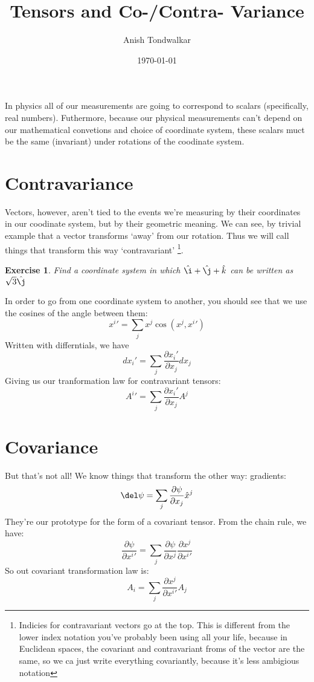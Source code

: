 \documentclass[11pt,notitlepage]{article}
\title{Tensors and Co-/Contra- Variance}
\author{Anish Tondwalkar}
\date{\today}
\newtheorem{exc}{Exercise}[section]
\begin{document}
\maketitle
In physics all of our measurements are going to correspond to scalars (specifically, real numbers). 
Futhermore, because our physical measurements can't depend on our mathematical convetions and choice of coordinate system,
 these scalars muct be the same (invariant) under rotations of the coodinate system.
\section{Contravariance}
 Vectors, however, aren't tied to the events we're measuring by their coordinates in our coodinate system, but by their geometric meaning.
 We can see, by trivial example that a vector transforms `away' from our rotation. 
Thus we will call things that transform this way `contravariant'
\footnote{Indicies for contravariant vectors go at the top. This is different from the lower index notation you've probably been using all your life, because in Euclidean spaces, the covariant and contravariant froms of the vector are the same, so we ca just write everything covariantly, because it's less ambigious notation}. 
\begin{exc}
Find a coordinate system in which
$\hat\i + \hat\j + \hat k$
 can be written as $\sqrt3 \hat\j$
\end{exc}
In order to go from one coordinate system to another, you should see that we use the cosines of the angle between them:
$$ x^i' = \sum_j x^j \cos(x^j,x^i') $$
Written with differntials, we have
$$ dx_i' = \sum_j \frac{\partial x_i'}{\partial x_j} dx_j $$
Giving us our tranformation law for contravariant tensors:
$$ A^i' = \sum_j \frac{\partial x_i'}{\partial x_j} A^j $$
\section{Covariance}
But that's not all! We know things that transform the other way: gradients:
$$ \del \psi = \sum_j \frac{\partial \psi}{\partial x_j} \hat x^j $$
 They're our prototype for the form of a covariant tensor. 
From the chain rule, we have: 
$$\frac{\partial \psi}{\partial x^i'} = \sum_j \frac{\partial \psi}{\partial x^j} \frac{\partial x^j}{\partial x^i'} $$
So out covariant transformation law is:
$$ A_i = \sum_j \frac{\partial x^j}{\partial x^i'} A_j$$
  
\end{document}
